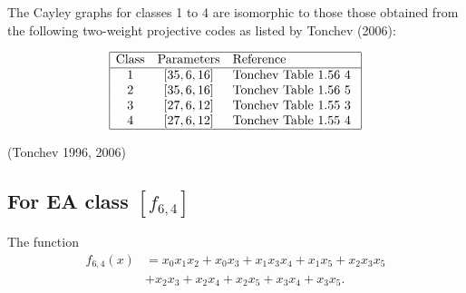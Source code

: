 \documentclass[12pt,a4paper]{article}
\newcommand{\slidecite}[1]{\tiny{(#1)}\normalsize{}}
\begin{document}
The Cayley graphs for classes 1 to 4 are isomorphic to those those obtained from the following two-weight projective
codes as listed by Tonchev (2006):

\begin{align*}
\begin{array}{|ccl|}
\hline
\text{Class} &
\text{Parameters} & \text{Reference}
\\
\hline
1 & [35,6,16] & \text{Tonchev Table 1.56 4 }
\\
2 & [35,6,16] & \text{Tonchev Table 1.56 5 }
\\
3 & [27,6,12] & \text{Tonchev Table 1.55 3 }
\\
4 & [27,6,12] & \text{Tonchev Table 1.55 4 }
\\
\hline
\end{array}
\end{align*}

\slidecite{Tonchev 1996, 2006}
\subsection*{For EA class $[f_{6,4}]$}

The function
\begin{align*}
f_{6,4}(x) &= x_{0} x_{1} x_{2} + x_{0} x_{3} + x_{1} x_{3} x_{4} + x_{1} x_{5} + x_{2} x_{3} x_{5} 
\\
           &+ x_{2} x_{3} + x_{2} x_{4} + x_{2} x_{5} + x_{3} x_{4} + x_{3} x_{5}.
\end{align*}
\end{document}
